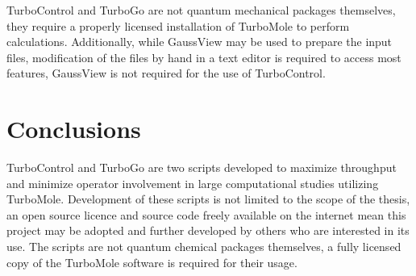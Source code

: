 TurboControl and TurboGo are not quantum mechanical packages themselves, they require a properly licensed installation of TurboMole to perform calculations. Additionally, while GaussView may be used to prepare the input files, modification of the files by hand in a text editor is required to access most features, GaussView is not required for the use of TurboControl. 

\section{Conclusions}

TurboControl and TurboGo are two scripts developed to maximize throughput and minimize operator involvement in large computational studies utilizing TurboMole. Development of these scripts is not limited to the scope of the thesis, an open source licence and source code freely available on the internet mean this project may be adopted and further developed by others who are interested in its use. The scripts are not quantum chemical packages themselves, a fully licensed copy of the TurboMole software is required for their usage.



